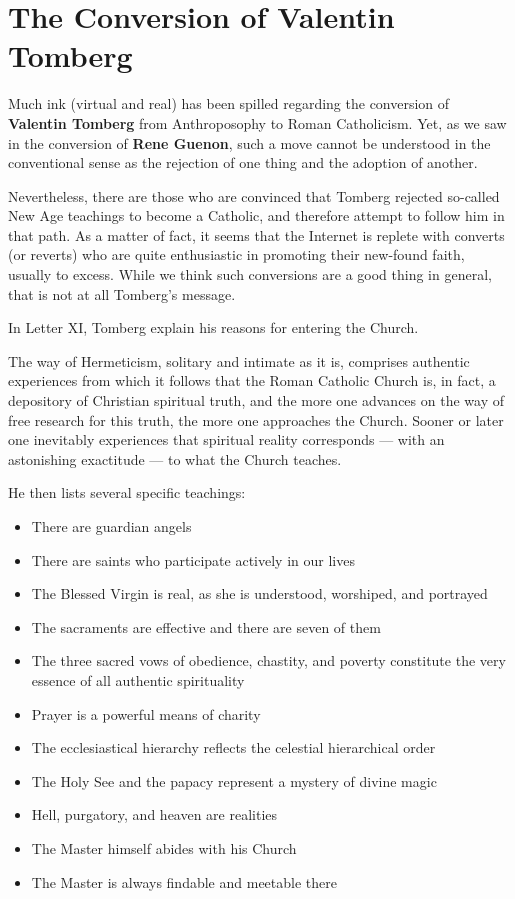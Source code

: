 \section{The Conversion of Valentin Tomberg}

Much ink (virtual and real) has been spilled regarding the conversion of \textbf{Valentin Tomberg} from Anthroposophy to
Roman Catholicism. Yet, as we saw in the conversion of \textbf{Rene Guenon}, such a move cannot be understood in the
conventional sense as the rejection of one thing and the adoption of another.

Nevertheless, there are those who are convinced that Tomberg rejected so-called New Age teachings to become a Catholic,
and therefore attempt to follow him in that path. As a matter of fact, it seems that the Internet is replete with
converts (or reverts) who are quite enthusiastic in promoting their new-found faith, usually to excess. While we think
such conversions are a good thing in general, that is not at all Tomberg's message.

In Letter XI, Tomberg explain his reasons for entering the Church.

\begin{quotationx}
The way of Hermeticism, solitary and intimate as it is, comprises authentic experiences from which it follows that the
Roman Catholic Church is, in fact, a depository of Christian spiritual truth, and the more one advances on the way of
free research for this truth, the more one approaches the Church. Sooner or later one inevitably experiences that
spiritual reality corresponds — with an astonishing exactitude — to what the Church teaches. 

\end{quotationx}
He then lists several specific teachings:

\begin{itemize}
\item There are guardian angels 
\item There are saints who participate actively in our lives 
\item The Blessed Virgin is real, as she is understood, worshiped, and portrayed 
\item The sacraments are effective and there are seven of them 
\item The three sacred vows of obedience, chastity, and poverty constitute the very essence of all authentic
spirituality 
\item Prayer is a powerful means of charity 
\item The ecclesiastical hierarchy reflects the celestial hierarchical order 
\item The Holy See and the papacy represent a mystery of divine magic 
\item Hell, purgatory, and heaven are realities 
\item The Master himself abides with his Church 
\item The Master is always findable and meetable there 
\end{itemize}
